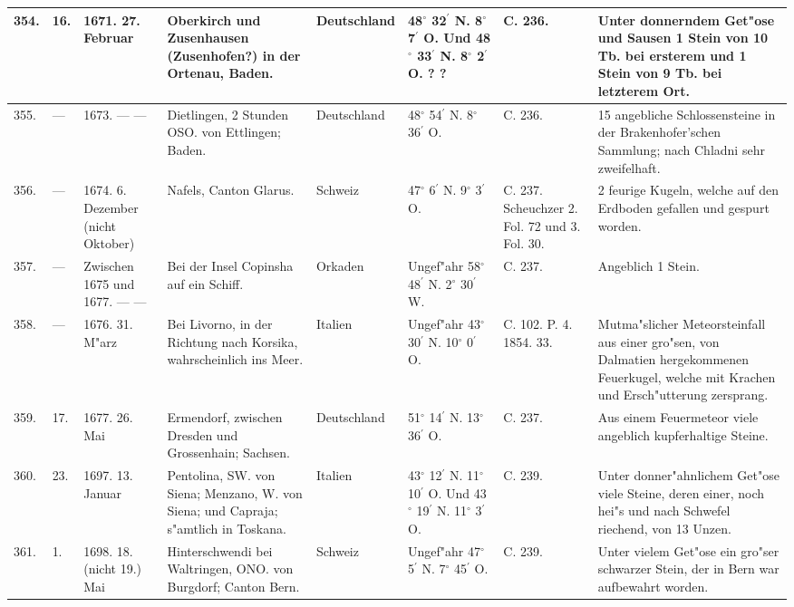\documentclass[a4paper, 8pt, oneside, polutonikogreek, german]{article}
\begin{document}
\begin{center}
\begin{longtable}{| p{4mm} | p{2mm} | p{15mm} | p{25mm} | p{16mm} | p{12mm} | p{13mm} | p{20mm} |}
        354. & 16. & 1671. 27. Februar & Oberkirch und Zusenhausen (Zusenhofen?) in der Ortenau, Baden. & Deutschland & 48$^\circ$ 32$^\prime$ N. 8$^\circ$ 7$^\prime$ O. Und 48$^\circ$ 33$^\prime$ N. 8$^\circ$ 2$^\prime$ O. ? ? & C. 236. & Unter donnerndem Get"ose und Sausen 1 Stein von 10 Tb. bei ersterem und 1 Stein von 9 Tb. bei letzterem Ort. \\ \hline
        355. & --- & 1673. --- --- & Dietlingen, 2 Stunden OSO. von Ettlingen; Baden. & Deutschland & 48$^\circ$ 54$^\prime$ N. 8$^\circ$ 36$^\prime$ O. & C. 236. & 15 angebliche Schlossensteine in der Brakenhofer’schen Sammlung; nach Chladni sehr zweifelhaft. \\ \hline
        356. & --- & 1674. 6. Dezember (nicht Oktober) & Nafels, Canton Glarus. & Schweiz & 47$^\circ$ 6$^\prime$ N. 9$^\circ$ 3$^\prime$ O. & C. 237. Scheuchzer 2. Fol. 72 und 3. Fol. 30. & 2 feurige Kugeln, welche auf den Erdboden gefallen und gespurt worden. \\ \hline
        357. & --- & Zwischen 1675 und 1677. --- --- & Bei der Insel Copinsha auf ein Schiff. & Orkaden & Ungef"ahr 58$^\circ$ 48$^\prime$ N. 2$^\circ$ 30$^\prime$ W. & C. 237. & Angeblich 1 Stein. \\ \hline
        358. & --- & 1676. 31. M"arz & Bei Livorno, in der Richtung nach Korsika, wahrscheinlich ins Meer. & Italien & Ungef"ahr 43$^\circ$ 30$^\prime$ N. 10$^\circ$ 0$^\prime$ O. & C. 102. P. 4. 1854. 33. & Mutma"slicher Meteorsteinfall aus einer gro"sen, von Dalmatien hergekommenen Feuerkugel, welche mit Krachen und Ersch"utterung zersprang. \\ \hline
        359. & 17. & 1677. 26. Mai & Ermendorf, zwischen Dresden und Grossenhain; Sachsen. & Deutschland & 51$^\circ$ 14$^\prime$ N. 13$^\circ$ 36$^\prime$ O. & C. 237. & Aus einem Feuermeteor viele angeblich kupferhaltige Steine. \\ \hline
        360. & 23. & 1697. 13. Januar & Pentolina, SW. von Siena; Menzano, W. von Siena; und Capraja; s"amtlich in Toskana. & Italien & 43$^\circ$ 12$^\prime$ N. 11$^\circ$ 10$^\prime$ O. Und 43$^\circ$ 19$^\prime$ N. 11$^\circ$ 3$^\prime$ O. & C. 239. & Unter donner"ahnlichem Get"ose viele Steine, deren einer, noch hei"s und nach Schwefel riechend, von 13 Unzen. \\ \hline
        361. & 1. & 1698. 18. (nicht 19.) Mai & Hinterschwendi bei Waltringen, ONO. von Burgdorf; Canton Bern. & Schweiz & Ungef"ahr 47$^\circ$ 5$^\prime$ N. 7$^\circ$ 45$^\prime$ O. & C. 239. & Unter vielem Get"ose ein gro"ser schwarzer Stein, der in Bern war aufbewahrt worden. \\ \hline

\end{longtable}
\end{center}
\end{document}
